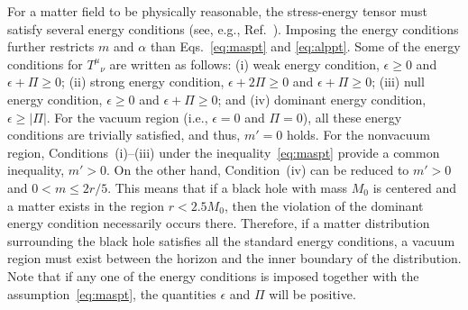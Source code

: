 \documentclass[aps,11pt,nofootinbib,preprintnumbers,groupedaddress,superscriptaddress]{revtex4-2}
\begin{document}
For a matter field to be physically reasonable, the stress-energy tensor must satisfy several energy conditions (see, e.g., Ref.~\cite{Wald:1984}).
Imposing the energy conditions further restricts 
$m$ and $\alpha$ than Eqs.~\eqref{eq:maspt} and \eqref{eq:alppt}.
Some of the energy conditions for $T^\mu{}_\nu$
are written as follows: (\hspace{.18em}i\hspace{.18em}) weak energy condition, $\epsilon\ge 0$ and $\epsilon+\Pi \geq 0$; 
(\hspace{.08em}ii\hspace{.08em}) strong energy condition, $\epsilon+2\Pi\geq 0$ and $\epsilon+\Pi \geq 0$; 
(i\hspace{-.08em}i\hspace{-.08em}i) null energy condition, $\epsilon\ge 0$ and $\epsilon+\Pi \geq 0$; and 
(i\hspace{-.08em}v\hspace{-.06em}) dominant energy condition, $\epsilon\geq |\Pi|$.
For the vacuum region (i.e., $\epsilon=0$ and $\Pi=0$), 
all these energy conditions are trivially satisfied, and thus, $m'=0$ holds.
For the nonvacuum region, Conditions~(\hspace{.18em}i\hspace{.18em})--(i\hspace{-.08em}i\hspace{-.08em}i) under the inequality~\eqref{eq:maspt} provide a common 
inequality, $m'>0$. On the other hand, Condition~(i\hspace{-.08em}v\hspace{-.06em}) can be reduced to 
$m'> 0$ and $0< m\le 2r/5$.
This means that if a black hole with mass $M_0$ is centered and a matter exists in the region $r<2.5M_0$, then the violation of 
the dominant energy condition necessarily occurs there. 
Therefore, if a matter distribution surrounding the black hole satisfies 
all the standard energy conditions, a 
vacuum region must exist between the horizon and the inner boundary of the distribution. 
Note that if any one of the energy conditions is imposed together with the assumption~\eqref{eq:maspt}, the quantities $\epsilon$ and $\Pi$ will be positive.
\end{document}
